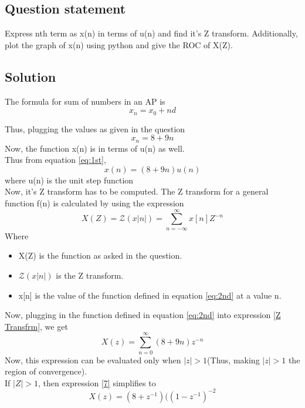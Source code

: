 \documentclass[journal,12pt,twocolumn]{IEEEtran}
\theoremstyle{remark}
\begin{document}
\subsection{Question statement}
Express nth term as x(n) in terms of u(n) and find it's Z transform. Additionally, plot the graph of x(n) using python and give the ROC of X(Z).\\
\subsection{Solution}
The formula for sum of numbers in an AP is 
$$x_n = x_0 + nd$$
\begin{table}[h]

\end{table}
\bigskip
Thus, plugging the values as given in the question
\begin{equation}\label{eq:1st}x_n = 8+9n\end{equation}
Now, the function x(n) is in terms of u(n) as well.\\ Thus from equation \ref{eq:1st},
\begin{equation}\label{eq:2nd}x(n) = (8 + 9n)u(n)\end{equation}
where u(n) is the unit step function\\
Now, it's Z transform has to be computed.
The Z transform for a general function f(n) is calculated by using the expression
\begin{equation}\label{Z Transform}X(Z) = \mathcal{Z}(x|n|) = \sum^{\infty}_{n=-\infty}x[n]Z^{-n}\end{equation}
Where
\begin{itemize}
    \item X(Z) is the function as asked in the question.
    \item $\mathcal{Z}(x|n|)$ is the Z transform.
    \item x[n] is the value of the function defined in equation \ref{eq:2nd} at a value n.
\end{itemize}
Now, plugging in the function defined in equation \ref{eq:2nd} into expression \ref{Z Transfrm}, we get
\begin{equation}\label{7} X(z) = \sum^{\infty}_{n=0}(8+9n)z^{-n}\end{equation}
Now, this expression can be evaluated only when $|z|>1$(Thus, making $|z|>1$ the region of convergence).\\
If $|Z|>1$, then expression \ref{7} simplifies to
\begin{equation}\label{8}X(z) = (8+z^{-1})({(1-z^{-1})}^{-2}\end{equation}
\end{document}
